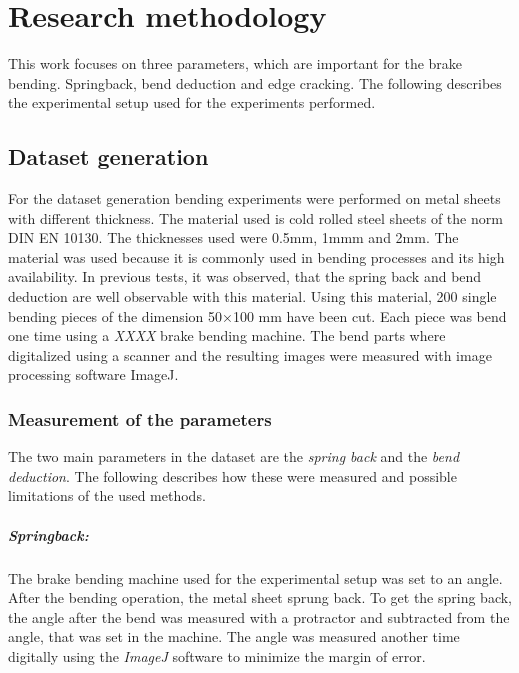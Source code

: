 \chapter{Research methodology} 

This work focuses on three parameters, which are important for the brake bending. Springback, bend deduction and edge cracking. 
The following describes the experimental setup used for the experiments performed. 

\section{Dataset generation} 
For the dataset generation bending experiments were performed on metal sheets with different thickness. 
The material used is cold rolled steel sheets of the norm DIN EN 10130. The thicknesses used were 0.5mm, 1mmm and 2mm. 
The material was used because it is commonly used in bending processes and its high availability. In previous tests, it was observed, that the spring back and bend deduction are well observable with this material. 
Using this material, 200 single bending pieces of the dimension 50×100 mm have been cut. 
Each piece was bend one time using a \textit{XXXX} brake bending machine. The bend parts where digitalized using a scanner and the resulting images were measured with image processing software ImageJ. 

\subsection{Measurement of the parameters}
The two main parameters in the dataset are the \textit{spring back} and the \textit{bend deduction}. 
The following describes how these were measured and possible limitations of the used methods. 

\paragraph{Springback:}
The brake bending machine used for the experimental setup was set to an angle. After the bending operation, the metal sheet sprung back. To get the spring back, the angle after the bend was measured with a protractor and subtracted from the angle, that was set in the machine. The angle was measured another time digitally using the \textit{ImageJ} software to minimize the margin of error.

